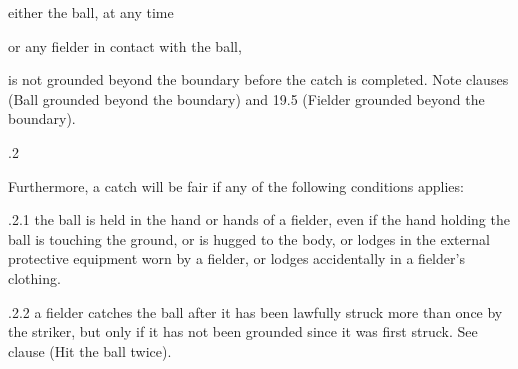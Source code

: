 \documentclass[12pt]{article}
\begin{document}
\vspace{\baselineskip}
\begin{adjustwidth}{0.5in}{0.0in}
{\fontsize{9pt}{10.8pt}\selectfont either the ball, at any time\par}\par

\end{adjustwidth}


\vspace{\baselineskip}
\begin{adjustwidth}{0.5in}{0.0in}
{\fontsize{9pt}{10.8pt}\selectfont or any fielder in contact with the ball,\par}\par

\end{adjustwidth}


\vspace{\baselineskip}
\begin{adjustwidth}{0.5in}{0.35in}
{\fontsize{9pt}{10.8pt}\selectfont is not grounded beyond the boundary before the catch is completed. Note clauses (Ball grounded beyond the boundary) and 19.5 (Fielder grounded beyond the boundary).\par}\par

\end{adjustwidth}


\vspace{\baselineskip}
{\fontsize{9pt}{10.8pt}.2 \tabto{0.49in} {\fontsize{8pt}{9.6pt}\selectfont Furthermore, a catch will be fair if any of the following conditions applies:\par}\par}\par


\vspace{\baselineskip}
\begin{adjustwidth}{1.18in}{0.06in}
{\fontsize{9pt}{10.8pt}.2.1 \tabto{1.17in} the ball is held in the hand or hands of a fielder, even if the hand holding the ball is touching the ground, or is hugged to the body, or lodges in the external protective equipment worn by a fielder, or lodges accidentally in a fielder’s clothing.\par}\par

\end{adjustwidth}


\vspace{\baselineskip}
\begin{adjustwidth}{1.18in}{0.07in}
{\fontsize{9pt}{10.8pt}.2.2 \tabto{1.17in} a fielder catches the ball after it has been lawfully struck more than once by the striker, but only if it has not been grounded since it was first struck. See clause (Hit the ball twice).\par}\par

\end{adjustwidth}
\end{document}
